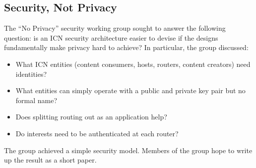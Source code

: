 \subsection{Security, Not Privacy}
The ``No Privacy'' security working group sought to answer the following question: is an ICN security architecture easier to devise if the designs fundamentally make privacy hard to achieve? In particular, the group discussed:

\begin{itemize}
\item What ICN entities (content consumers, hosts, routers, content creators) need identities?
\item What entities can simply operate with a public and private key pair but no formal name?
\item Does splitting routing out as an application help?
\item Do interests need to be authenticated at each router?
\end{itemize}

The group achieved a simple security model. Members of the group hope to write up the result as a short paper.
